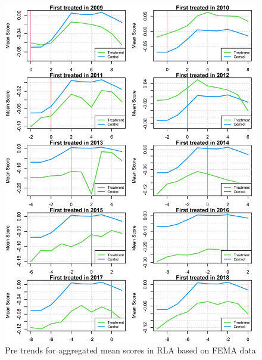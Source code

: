 \begin{figure}[!h]
	\centering
	\includegraphics[scale=1]{"../Code & Data/ParTrendsPlotRLAFEMA.png"}
	\caption{Pre trends for aggregated mean scores in RLA based on FEMA data}
	\label{PreTrendsRLA}
\end{figure}

